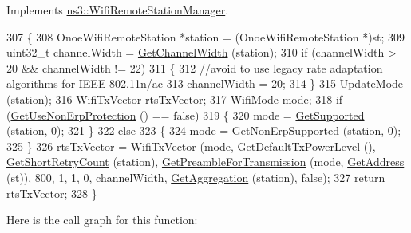 Implements \hyperlink{classns3_1_1WifiRemoteStationManager_abf44eccb31d4b1b58644fd6721d132c9}{ns3\+::\+Wifi\+Remote\+Station\+Manager}.


\begin{DoxyCode}
307 \{
308   OnoeWifiRemoteStation *station = (OnoeWifiRemoteStation *)st;
309   uint32\_t channelWidth = \hyperlink{classns3_1_1WifiRemoteStationManager_a918213c5b9fa629c4986f6d90521bbd4}{GetChannelWidth} (station);
310   \textcolor{keywordflow}{if} (channelWidth > 20 && channelWidth != 22)
311     \{
312       \textcolor{comment}{//avoid to use legacy rate adaptation algorithms for IEEE 802.11n/ac}
313       channelWidth = 20;
314     \}
315   \hyperlink{classns3_1_1OnoeWifiManager_afecc5c3113a6fa42f1d784fec75e3876}{UpdateMode} (station);
316   WifiTxVector rtsTxVector;
317   WifiMode mode;
318   \textcolor{keywordflow}{if} (\hyperlink{classns3_1_1WifiRemoteStationManager_a2d3d93f08995e554960a177a52f90f2f}{GetUseNonErpProtection} () == \textcolor{keyword}{false})
319     \{
320       mode = \hyperlink{classns3_1_1WifiRemoteStationManager_a995c8bae0d84b168fd3e8bc9ecaacdd4}{GetSupported} (station, 0);
321     \}
322   \textcolor{keywordflow}{else}
323     \{
324       mode = \hyperlink{classns3_1_1WifiRemoteStationManager_a3df8f1931f1fce653e5990a2821b44c6}{GetNonErpSupported} (station, 0);
325     \}
326   rtsTxVector = WifiTxVector (mode, \hyperlink{classns3_1_1WifiRemoteStationManager_acff2fc859ee6b4c66ea7a83dd075b5d6}{GetDefaultTxPowerLevel} (), 
      \hyperlink{classns3_1_1WifiRemoteStationManager_ad61157a9a56cf668f3255730f6a416b2}{GetShortRetryCount} (station), \hyperlink{classns3_1_1WifiRemoteStationManager_a0f44967cbd7488baada4802ebc642110}{GetPreambleForTransmission} (mode,
       \hyperlink{classns3_1_1WifiRemoteStationManager_ac9ccc8c514bd8d2af05c290e63461a2a}{GetAddress} (st)), 800, 1, 1, 0, channelWidth, \hyperlink{classns3_1_1WifiRemoteStationManager_a5421c8d510cb16eebeac9f2ea9dd73c3}{GetAggregation} (station), \textcolor{keyword}{false});
327   \textcolor{keywordflow}{return} rtsTxVector;
328 \}
\end{DoxyCode}


Here is the call graph for this function\+:


